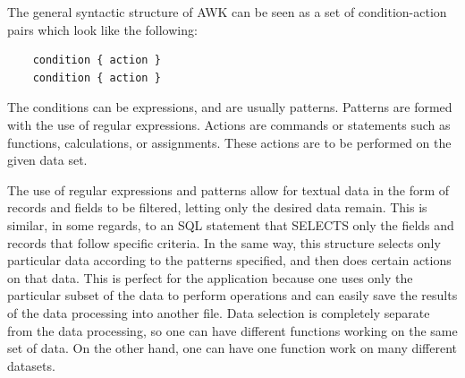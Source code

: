 \documentclass[a4paper]{article}
\begin{document}
	The general syntactic structure of AWK can be seen as a set of condition-action pairs which look like the following:
	\begin{lstlisting}
	condition { action }
	condition { action }
	\end{lstlisting}
	The conditions can be expressions, and are usually patterns. Patterns are formed with the use of regular expressions. Actions are commands or statements such as functions, calculations, or assignments. These actions are to be performed on the given data set.
	
	The use of regular expressions and patterns allow for textual data in the form of records and fields to be filtered, letting only the desired data remain. This is similar, in some regards, to an SQL statement that SELECTS only the fields and records that follow specific criteria. In the same way, this structure selects only particular data according to the patterns specified, and then does certain actions on that data. This is perfect for the application because one uses only the particular subset of the data to perform operations and can easily save the results of the data processing into another file. Data selection is completely separate from the data processing, so one can have different functions working on the same set of data. On the other hand, one can have one function work on many different datasets.

{}

	
\end{document}
